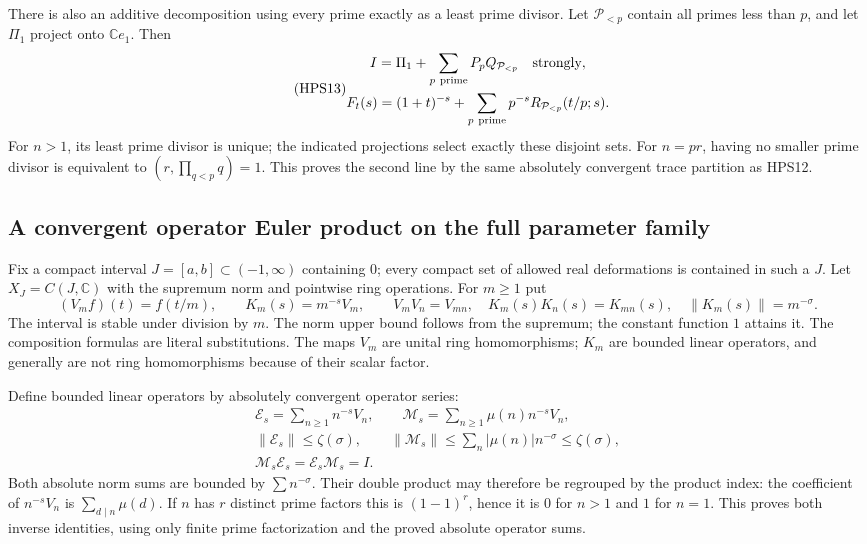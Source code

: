 There is also an additive decomposition using
every prime exactly as a least prime divisor.
Let $\mathcal P_{<p}$ contain all primes less
than $p$, and let $\Pi_1$ project onto $\mathbb C e_1$.
Then
\begin{equation}\tag{HPS13}
\begin{gathered}
 I=\Pi_1+\sum_{p\ {\rm prime}}P_pQ_{\mathcal P_{<p}}
                                \quad\hbox{strongly},\\
 F_t(s)=(1+t)^{-s}
       +\sum_{p\ {\rm prime}}p^{-s}
                    R_{\mathcal P_{<p}}(t/p;s).
\end{gathered}
\end{equation}
For $n>1$, its least prime divisor is unique;
the indicated projections select exactly these
disjoint sets. For $n=pr$, having no smaller
prime divisor is equivalent to $(r,\prod_{q<p}q)=1$.
This proves the second line by the same absolutely
convergent trace partition as HPS12.

\subsection{A convergent operator Euler product on the full parameter family}

Fix a compact interval $J=[a,b]\subset(-1,\infty)$
containing $0$; every compact set of allowed real
deformations is contained in such a $J$.
Let $X_J=C(J,\mathbb C)$ with the supremum norm
and pointwise ring operations. For $m\ge1$ put
\begin{equation}\tag{HPS14}
 (V_mf)(t)=f(t/m),\qquad
 K_m(s)=m^{-s}V_m,\qquad
 V_mV_n=V_{mn},\quad K_m(s)K_n(s)=K_{mn}(s),\quad
 \|K_m(s)\|=m^{-\sigma}.
\end{equation}
The interval is stable under division by $m$.
The norm upper bound follows from the supremum;
the constant function $1$ attains it. The
composition formulas are literal substitutions.
The maps $V_m$ are unital ring homomorphisms;
$K_m$ are bounded linear operators, and generally
are not ring homomorphisms because of their
scalar factor.

Define bounded linear operators by absolutely
convergent operator series:
\begin{equation}\tag{HPS15}
\begin{gathered}
 \mathcal E_s=\sum_{n\ge1}n^{-s}V_n,\qquad
 \mathcal M_s=\sum_{n\ge1}\mu(n)n^{-s}V_n,\\
 \|\mathcal E_s\|\le\zeta(\sigma),\qquad
 \|\mathcal M_s\|\le\sum_n|\mu(n)|n^{-\sigma}
                                      \le\zeta(\sigma),\\
 \mathcal M_s\mathcal E_s=\mathcal E_s\mathcal M_s=I.
\end{gathered}
\end{equation}
Both absolute norm sums are bounded by
$\sum n^{-\sigma}$. Their double product may
therefore be regrouped by the product index:
the coefficient of $n^{-s}V_n$ is
$\sum_{d\mid n}\mu(d)$. If $n$ has $r$ distinct
prime factors this is $(1-1)^r$, hence it is
$0$ for $n>1$ and $1$ for $n=1$. This proves
both inverse identities, using only finite
prime factorization and the proved absolute
operator sums.

